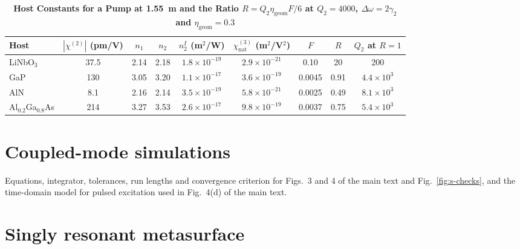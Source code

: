 \documentclass[9pt]{osa-supplemental-document}
\newcommand{\chitwo}{\chi^{(2)}}
\newcommand{\chinat}{\chi^{(3)}_{\mathrm{nat}}}
\newcommand{\Dom}{\Delta\omega}
\newcommand{\etag}{\eta_{\mathrm{geom}}}
\begin{document}
\begin{table}[htbp]
  \centering
  \caption{\bf Host Constants for a Pump at 1.55~\textmu m and the Ratio $R=Q_2\etag F/6$ at $Q_2=4000$, $\Dom=2\gamma_2$ and $\etag=0.3$}
  \label{tab:s-hosts}
  \small
  \setlength{\tabcolsep}{4pt}
  \begin{tabular}{lcccccccc}
    \toprule
    Host & $|\chitwo|$ (pm/V) & $n_1$ & $n_2$ & $n_2^I$ (m$^2$/W) & $\chinat$ (m$^2$/V$^2$) & $F$ & $R$ & $Q_2$ at $R=1$\\
    \midrule
    LiNbO$_3$ & 37.5 & 2.14 & 2.18 & $1.8\times10^{-19}$ & $2.9\times10^{-21}$ & 0.10   & 20   & 200 \\
    GaP       & 130  & 3.05 & 3.20 & $1.1\times10^{-17}$ & $3.6\times10^{-19}$ & 0.0045 & 0.91 & $4.4\times10^3$ \\
    AlN       & 8.1  & 2.16 & 2.14 & $3.5\times10^{-19}$ & $5.8\times10^{-21}$ & 0.0025 & 0.49 & $8.1\times10^3$ \\
    Al$_{0.2}$Ga$_{0.8}$As & 214 & 3.27 & 3.53 & $2.6\times10^{-17}$ & $9.8\times10^{-19}$ & 0.0037 & 0.75 & $5.4\times10^3$ \\
    \bottomrule
  \end{tabular}
\end{table}

\section{Coupled-mode simulations}

Equations, integrator, tolerances, run lengths and convergence criterion
for Figs.~3 and 4 of the main text and Fig.~\ref{fig:s-checks}, and the
time-domain model for pulsed excitation used in Fig.~4(d) of the main
text.

\section{Singly resonant metasurface}
\end{document}
